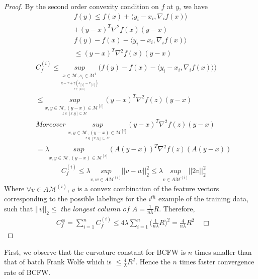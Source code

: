 \documentclass{article}
\begin{document}
\begin{proof}
By the second order convexity condition on $f$ at $y$, we have
\begin{align*}
    f(y)\leq f(x)+ \langle y_{i}-x_{i}, \nabla_{i} f(x)\rangle\\
    + (y- x)^{T}\nabla^{2}f(x)(y- x)\\
    f(y)- f(x)- \langle y_{i}-x_{i}, \nabla_{i} f(x)\rangle\\
    \leq (y- x)^{T}\nabla^{2}f(x)(y- x)
\end{align*}
\begin{equation*}
\begin{aligned}
    &C^{(i)}_{f}\leq\underset{\underset{\underset{\gamma\in[0,1]}{y=x+\gamma(s_{[i]}-x_{[i]})}}{x\in\mathcal{M},s_{i}\in\mathcal{M}^{i}}}{sup}\Big(f(y)- f(x)- \langle y_{i}-x_{i}, \nabla_{i} f(x)\rangle\Big)\\
    &\leq \underset{\underset{z\in[x,y]\subseteq\mathcal{M}}{x,y\in\mathcal{M},(y-x)\in\mathcal{M}^{[i]}}}{sup}(y- x)^{T}\nabla^{2}f(z)(y- x)\\
    &\textit{Moreover } \underset{\underset{z\in[x,y]\subseteq\mathcal{M}}{x,y\in\mathcal{M},(y-x)\in\mathcal{M}^{[i]}}}{sup}(y- x)^{T}\nabla^{2}f(z)(y- x)\\
    &= \lambda \underset{{x,y\in\mathcal{M},(y-x)\in\mathcal{M}^{[i]}}}{sup}(A(y- x))^{T}\nabla^{2}f(z)(A(y- x))
\end{aligned}
\end{equation*}
\begin{equation*}
\begin{aligned}
    &C^{(i)}_{f}\leq \lambda \underset{v,w\in A\mathcal{M}^{(i)}}{sup}||v- w||^{2}_{2}\leq \lambda \underset{v\in A\mathcal{M}^{(i)}}{sup}||2v||^{2}_{2}
\end{aligned}
\end{equation*}
Where $\forall v\in A\mathcal{M}^{(i)}$, $v$ is a convex combination of the feature vectors corresponding to the possible labelings for the $i^{th}$ example of the training data, such that $||v||_{2}\leq\textit{ the longest column of A}= \frac{1}{n\lambda}R$. Therefore,
\begin{equation*}
\begin{aligned}
    &C^{\otimes}_{f}= \sum_{i=1}^{n}C^{(i)}_{f}\leq 4\lambda\sum_{i=1}^{n}\Big(\frac{1}{n\lambda}R\Big)^{2}= \frac{4}{n\lambda}R^{2}\quad\Box
\end{aligned}
\end{equation*}
\end{proof}
First, we observe that the curvature constant for BCFW is $n$ times smaller than that of batch Frank Wolfe which is $\leq \frac{4}{\lambda}R^{2}$. Hence the $n$ times faster convergence rate of BCFW. 
\end{document}
